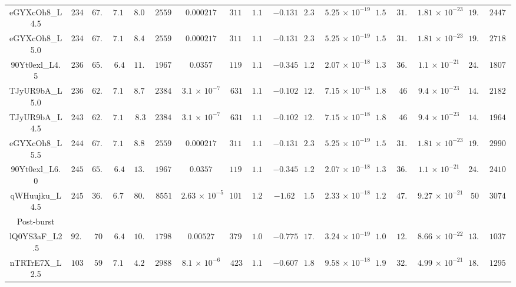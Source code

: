 \begin{appendix}
\begin{table}
\begin{tabular}{ccccccccccccccccc}
eGYXcOh8\_L4.5 & $ 234$ & $ 67.6$ & $ 7.11$ & $ 8.04$ & $ 25590$ & $ 0.000217$ & $ 3110$ & $ 1.18$ & $ -0.131$ & $ 2.34$ & $ 5.25\,{\times}\,10^{-19}$ & $ 1.56$ & $ 31.5$ & $ 1.81\,{\times}\,10^{-23}$ & $ 19.3$ & $ 24470$ \\ 
eGYXcOh8\_L5.0 & $ 234$ & $ 67.6$ & $ 7.11$ & $ 8.47$ & $ 25590$ & $ 0.000217$ & $ 3110$ & $ 1.18$ & $ -0.131$ & $ 2.34$ & $ 5.25\,{\times}\,10^{-19}$ & $ 1.56$ & $ 31.5$ & $ 1.81\,{\times}\,10^{-23}$ & $ 19.3$ & $ 27185$ \\ 
90Yt0exl\_L4.5 & $ 236$ & $ 65.5$ & $ 6.4$ & $ 11.7$ & $ 19670$ & $ 0.0357$ & $ 1191$ & $ 1.13$ & $ -0.345$ & $ 1.25$ & $ 2.07\,{\times}\,10^{-18}$ & $ 1.39$ & $ 36.4$ & $ 1.1\,{\times}\,10^{-21}$ & $ 24.1$ & $ 18077$ \\ 
TJyUR9bA\_L5.0 & $ 236$ & $ 62.6$ & $ 7.11$ & $ 8.74$ & $ 23840$ & $ 3.1\,{\times}\,10^{-7}$ & $ 631$ & $ 1.17$ & $ -0.102$ & $ 12.7$ & $ 7.15\,{\times}\,10^{-18}$ & $ 1.89$ & $ 46$ & $ 9.4\,{\times}\,10^{-23}$ & $ 14.4$ & $ 21828$ \\ 
TJyUR9bA\_L4.5 & $ 243$ & $ 62.6$ & $ 7.11$ & $ 8.3$ & $ 23840$ & $ 3.1\,{\times}\,10^{-7}$ & $ 631$ & $ 1.17$ & $ -0.102$ & $ 12.7$ & $ 7.15\,{\times}\,10^{-18}$ & $ 1.89$ & $ 46$ & $ 9.4\,{\times}\,10^{-23}$ & $ 14.4$ & $ 19644$ \\ 
eGYXcOh8\_L5.5 & $ 244$ & $ 67.6$ & $ 7.11$ & $ 8.88$ & $ 25590$ & $ 0.000217$ & $ 3110$ & $ 1.18$ & $ -0.131$ & $ 2.34$ & $ 5.25\,{\times}\,10^{-19}$ & $ 1.56$ & $ 31.5$ & $ 1.81\,{\times}\,10^{-23}$ & $ 19.3$ & $ 29907$ \\ 
90Yt0exl\_L6.0 & $ 245$ & $ 65.5$ & $ 6.4$ & $ 13.5$ & $ 19670$ & $ 0.0357$ & $ 1191$ & $ 1.13$ & $ -0.345$ & $ 1.25$ & $ 2.07\,{\times}\,10^{-18}$ & $ 1.39$ & $ 36.4$ & $ 1.1\,{\times}\,10^{-21}$ & $ 24.1$ & $ 24108$ \\ 
qWHuujku\_L4.5 & $ 245$ & $ 36.2$ & $ 6.75$ & $ 80.7$ & $ 8551$ & $ 2.63\,{\times}\,10^{-5}$ & $ 1015$ & $ 1.23$ & $ -1.62$ & $ 1.52$ & $ 2.33\,{\times}\,10^{-18}$ & $ 1.28$ & $ 47.8$ & $ 9.27\,{\times}\,10^{-21}$ & $ 50$ & $ 30745$ \\ 
\noalign{\smallskip} 
\hline 
Post-burst\\
\noalign{\smallskip} 
\hline 
\noalign{\smallskip} 
lQ0YS3aF\_L2.5 & $ 92.7$ & $ 70$ & $ 6.4$ & $ 10.6$ & $ 17980$ & $ 0.00527$ & $ 3798$ & $ 1.06$ & $ -0.775$ & $ 17.3$ & $ 3.24\,{\times}\,10^{-19}$ & $ 1.06$ & $ 12.5$ & $ 8.66\,{\times}\,10^{-22}$ & $ 13.5$ & $ 10376$ \\ 
nTRTrE7X\_L2.5 & $ 103$ & $ 59$ & $ 7.11$ & $ 4.29$ & $ 29889$ & $ 8.1\,{\times}\,10^{-6}$ & $ 423$ & $ 1.13$ & $ -0.607$ & $ 1.85$ & $ 9.58\,{\times}\,10^{-18}$ & $ 1.94$ & $ 32.7$ & $ 4.99\,{\times}\,10^{-21}$ & $ 18.1$ & $ 12950$ \\ 

\end{tabular}
\end{table}
\end{appendix}
